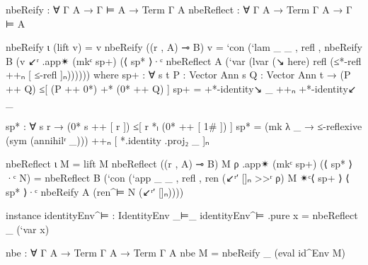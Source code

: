 \begin{code}
  nbeReify : ∀ {Γ} A → Γ ⊨ A → Term Γ A
  nbeReflect : ∀ {Γ} A → Term Γ A → Γ ⊨ A

  nbeReify ι (lift v) = v
  nbeReify ((r , A) ⊸ B) v =
    `con (`lam _ _ , refl ,
      nbeReify B (v ↙ʳ .app✴ (mkᶜ sp+) (⟨ sp* ⟩·ᶜ
        nbeReflect A (`var (lvar (↘ here) refl (≤*-refl ++ₙ [ ≤-refl ]ₙ))))))
    where
    sp+ : ∀ {s t} {P : Vector Ann s} {Q : Vector Ann t} →
      (P ++ Q) ≤[ (P ++ 0*) +* (0* ++ Q) ]
    sp+ = +*-identity↘ _ ++ₙ +*-identity↙ _

    sp* : ∀ {s r} → (0* {s} ++ [ r ]) ≤[ r *ₗ (0* ++ [ 1# ]) ]
    sp* = (mk λ _ → ≤-reflexive (sym (annihilʳ _))) ++ₙ [ *.identity .proj₂ _ ]ₙ

  nbeReflect ι M = lift M
  nbeReflect ((r , A) ⊸ B) M ρ .app✴ (mkᶜ sp+) (⟨ sp* ⟩·ᶜ N) =
    nbeReflect B (`con (`app _ _ , refl ,
      ren (↙ʳ′ []ₙ >>ʳ ρ) M ✴ᶜ⟨ sp+ ⟩ ⟨ sp* ⟩·ᶜ nbeReify A (ren^⊨ N (↙ʳ′ []ₙ))))

  instance
    identityEnv^⊨ : IdentityEnv _⊨_
    identityEnv^⊨ .pure x = nbeReflect _ (`var x)

  nbe : ∀ {Γ A} → Term Γ A → Term Γ A
  nbe M = nbeReify _ (eval id^Env M)
\end{code}
